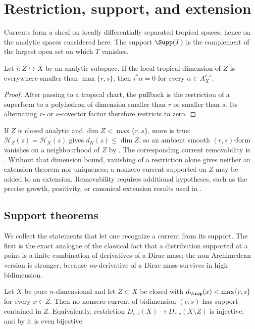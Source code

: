 \section{Restriction, support, and extension}

Currents form a sheaf on locally differentially separated tropical spaces,
hence on the analytic spaces considered here.  The support $\Supp(T)$ is the
complement of the largest open set on which $T$ vanishes.

\begin{proposition}
\label{prop:form-restriction-dimension-gap}
Let $i:Z\hookrightarrow X$ be an analytic subspace.  If the local tropical
dimension of $Z$ is everywhere smaller than $\max\{r,s\}$, then
$i^*\alpha=0$ for every $\alpha\in A_X^{r,s}$.
\end{proposition}
\begin{proof}
After passing to a tropical chart, the pullback is the restriction of a
superform to a polyhedron of dimension smaller than $r$ or smaller than
$s$.  Its alternating $r$- or $s$-covector factor therefore restricts to
zero.
\end{proof}

If $Z$ is closed analytic and $\dim Z<\max\{r,s\}$, more is true:
$\mathcal H_Z(z)=\mathcal H_X(z)$ gives $d_K(z)\le\dim Z$, so an
ambient smooth $(r,s)$-form vanishes on a neighbourhood of $Z$ by
\cite[Proposition~15.2.1(b)]{CLD25}. The corresponding current
removability is . Without that
dimension bound, vanishing of a restriction alone gives neither an
extension theorem nor uniqueness; a nonzero current supported on $Z$
may be added to an extension.  Removability requires
additional hypotheses, such as the precise growth, positivity, or canonical
extension results used in
.

\subsection{Support theorems}
\label{sec:ch14-support-theorems}

We collect the statements that let one recognize a current from its support.
The first is the exact analogue of the classical fact that a distribution
supported at a point is a finite combination of derivatives of a Dirac mass;
the non-Archimedean version is stronger, because \emph{no} derivative of a
Dirac mass survives in high bidimension.

\begin{theorem}
\label{thm:ch14-support-dimension}
Let $X$ be pure $n$-dimensional and let $Z\subset X$ be closed with
$d_{\trop}(x)<\max\{r,s\}$ for every $x\in Z$.  Then no nonzero current of
bidimension $(r,s)$ has support contained in $Z$.  Equivalently, restriction
$D_{r,s}(X)\to D_{r,s}(X\setminus Z)$ is injective, and by
 it is even bijective.
\end{theorem}

